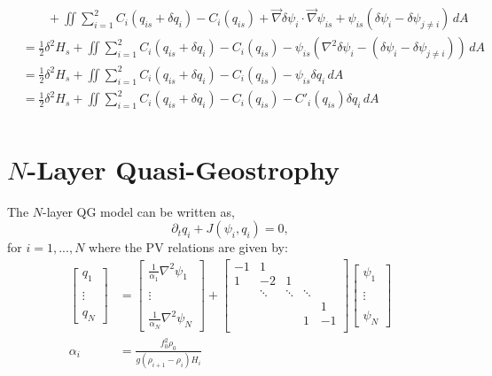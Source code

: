 \documentclass[12pt]{article}
\begin{document}
\begin{align*}
      &\quad\quad + \iint \sum_{i=1}^2 C_i(q_{is} + \delta q_i) - C_i(q_{is}) + \vec\nabla\delta\psi_i \cdot \vec\nabla\psi_{is} + \psi_{is}(\delta\psi_i - \delta\psi_{j \ne i}) \, dA \\
      &= \frac12 \delta^2 H_s + \iint \sum_{i=1}^2 C_i(q_{is} + \delta q_i) - C_i(q_{is}) - \psi_{is}(\nabla^2\delta\psi_i - (\delta\psi_i - \delta\psi_{j \ne i})) \, dA \\
      &= \frac12 \delta^2 H_s + \iint \sum_{i=1}^2 C_i(q_{is} + \delta q_i) - C_i(q_{is}) - \psi_{is}\delta q_i \, dA \\
      &= \frac12 \delta^2 H_s + \iint \sum_{i=1}^2 C_i(q_{is} + \delta q_i) - C_i(q_{is}) - C'_i(q_{is})\delta q_i \, dA \\
    \end{align*}


\section{$N$-Layer Quasi-Geostrophy}

  The $N$-layer QG model can be written as,
  $$
  \partial_t q_i + J(\psi_i, q_i) = 0,
  $$
  for $i=1,...,N$ where the PV relations are given by:
  \begin{align*}
    \left[\begin{array}{c}
      q_1 \\
      \\
      \vdots \\
      \\
      q_N
    \end{array}\right]
    &=
    \left[\begin{array}{c}
      \frac{1}{\alpha_1}\nabla^2 \psi_1 \\
      \\
      \vdots \\
      \\
      \frac{1}{\alpha_N}\nabla^2 \psi_N
    \end{array}\right]
    +
    \left[\begin{array}{ccccc}
      -1 & 1 & & & \\
      1 & -2 & 1 & & \\
       & \ddots & \ddots & \ddots & \\
       & & & & 1 \\
       & & & 1 & -1\\
    \end{array}\right]
    \left[\begin{array}{c}
      \psi_1 \\
      \\
      \vdots \\
      \\
      \psi_N
    \end{array}\right] \\
    \alpha_i &= \frac{f_0^2 \rho_0}{g (\rho_{i+1} - \rho_i) H_i}
  \end{align*}
\end{document}
